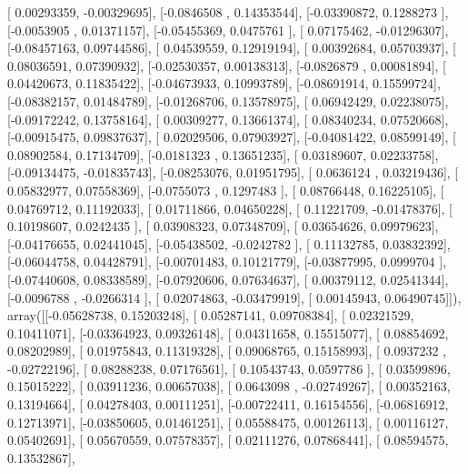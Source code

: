 \documentclass{article}
\begin{document}
       [ 0.00293359, -0.00329695],
       [-0.0846508 ,  0.14353544],
       [-0.03390872,  0.1288273 ],
       [-0.0053905 ,  0.01371157],
       [-0.05455369,  0.0475761 ],
       [ 0.07175462, -0.01296307],
       [-0.08457163,  0.09744586],
       [ 0.04539559,  0.12919194],
       [ 0.00392684,  0.05703937],
       [ 0.08036591,  0.07390932],
       [-0.02530357,  0.00138313],
       [-0.0826879 ,  0.00081894],
       [ 0.04420673,  0.11835422],
       [-0.04673933,  0.10993789],
       [-0.08691914,  0.15599724],
       [-0.08382157,  0.01484789],
       [-0.01268706,  0.13578975],
       [ 0.06942429,  0.02238075],
       [-0.09172242,  0.13758164],
       [ 0.00309277,  0.13661374],
       [ 0.08340234,  0.07520668],
       [-0.00915475,  0.09837637],
       [ 0.02029506,  0.07903927],
       [-0.04081422,  0.08599149],
       [ 0.08902584,  0.17134709],
       [-0.0181323 ,  0.13651235],
       [ 0.03189607,  0.02233758],
       [-0.09134475, -0.01835743],
       [-0.08253076,  0.01951795],
       [ 0.0636124 ,  0.03219436],
       [ 0.05832977,  0.07558369],
       [-0.0755073 ,  0.1297483 ],
       [ 0.08766448,  0.16225105],
       [ 0.04769712,  0.11192033],
       [ 0.01711866,  0.04650228],
       [ 0.11221709, -0.01478376],
       [ 0.10198607,  0.0242435 ],
       [ 0.03908323,  0.07348709],
       [ 0.03654626,  0.09979623],
       [-0.04176655,  0.02441045],
       [-0.05438502, -0.0242782 ],
       [ 0.11132785,  0.03832392],
       [-0.06044758,  0.04428791],
       [-0.00701483,  0.10121779],
       [-0.03877995,  0.0999704 ],
       [-0.07440608,  0.08338589],
       [-0.07920606,  0.07634637],
       [ 0.00379112,  0.02541344],
       [-0.0096788 , -0.0266314 ],
       [ 0.02074863, -0.03479919],
       [ 0.00145943,  0.06490745]]), array([[-0.05628738,  0.15203248],
       [ 0.05287141,  0.09708384],
       [ 0.02321529,  0.10411071],
       [-0.03364923,  0.09326148],
       [ 0.04311658,  0.15515077],
       [ 0.08854692,  0.08202989],
       [ 0.01975843,  0.11319328],
       [ 0.09068765,  0.15158993],
       [ 0.0937232 , -0.02722196],
       [ 0.08288238,  0.07176561],
       [ 0.10543743,  0.0597786 ],
       [ 0.03599896,  0.15015222],
       [ 0.03911236,  0.00657038],
       [ 0.0643098 , -0.02749267],
       [ 0.00352163,  0.13194664],
       [ 0.04278403,  0.00111251],
       [-0.00722411,  0.16154556],
       [-0.06816912,  0.12713971],
       [-0.03850605,  0.01461251],
       [ 0.05588475,  0.00126113],
       [ 0.00116127,  0.05402691],
       [ 0.05670559,  0.07578357],
       [ 0.02111276,  0.07868441],
       [ 0.08594575,  0.13532867],
\end{document}
